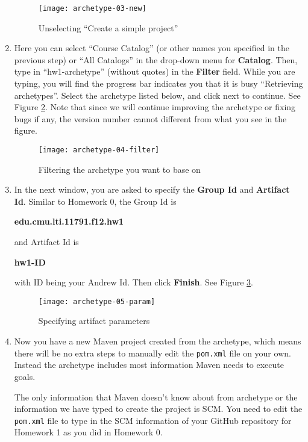 \begin{enumerate}
\begin{figure}[t]
\centering
\texttt{[image: archetype-03-new]}
\caption{Unselecting ``Create a simple project''\label{fig:archetype-03-new}}
\end{figure}

\item Here you can select ``Course Catalog'' (or other names you specified in
the previous step) or ``All Catalogs'' in the drop-down menu for
\textbf{Catalog}. Then, type in ``hw1-archetype'' (without quotes) in the \textbf{Filter}
field. While you are typing, you will find the progress bar indicates you that
it is busy ``Retrieving archetypes''. Select the archetype listed below, and
click next to continue. See Figure \ref{fig:archetype-04-filter}. Note that
since we will continue improving the archetype or fixing bugs if any, the
version number cannot different from what you see in the figure.

\begin{figure}[t]
\centering
\texttt{[image: archetype-04-filter]}
\caption{Filtering the archetype you want to base on\label{fig:archetype-04-filter}}
\end{figure}

\item In the next window, you are asked to specify the \textbf{Group Id} and
\textbf{Artifact Id}. Similar to Homework 0, the Group Id is

\begin{center}
\textbf{edu.cmu.lti.11791.f12.hw1}
\end{center}

and Artifact Id is

\begin{center}
\textbf{hw1-ID}
\end{center}

with ID being your Andrew Id. Then click \textbf{Finish}. See Figure
\ref{fig:archetype-05-param}.

\begin{figure}[t]
\centering
\texttt{[image: archetype-05-param]}
\caption{Specifying artifact parameters\label{fig:archetype-05-param}}
\end{figure}

\item Now you have a new Maven project created from the archetype, which means
there will be no extra steps to manually edit the \verb|pom.xml| file on your
own. Instead the archetype includes most information Maven needs to execute
goals.

The only information that Maven doesn't know about from archetype or the
information we have typed to create the project is SCM. You need to edit the
\texttt{pom.xml} file to type in the SCM information of your GitHub repository
for Homework 1 as you did in Homework 0.

\end{enumerate}

